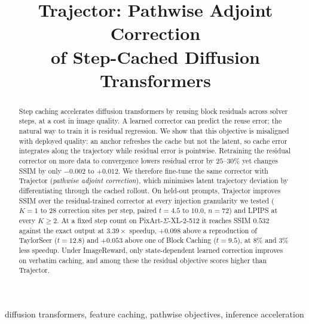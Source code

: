 \documentclass[conference,compsoc]{IEEEtran}
\newcommand{\ourmethod}{Trajector}
\begin{document}

\title{Trajector: Pathwise Adjoint Correction\\ of Step-Cached Diffusion Transformers}

\author{
}

\maketitle

\begin{abstract}
Step caching accelerates diffusion transformers by reusing block residuals
across solver steps, at a cost in image quality. A learned corrector can
predict the reuse error; the natural way to train it is residual regression. We show that this objective is misaligned with
deployed quality: an anchor refreshes the cache but not the latent, so cache
error integrates along the trajectory while residual error is pointwise.
Retraining the residual corrector on more data to convergence lowers residual error by $25$--$30\%$ yet changes SSIM by only $-0.002$ to $+0.012$. We therefore fine-tune the same corrector with
\ourmethod{} (\emph{pathwise adjoint correction}), which minimises latent trajectory
deviation by differentiating through the cached rollout. On
held-out prompts, \ourmethod{} improves SSIM over the residual-trained corrector at every injection granularity we tested ($K{=}1$ to $28$ correction sites per step, paired $t{=}4.5$ to $10.0$, $n{=}72$) and LPIPS at every $K{\ge}2$. At a fixed step count on
PixArt-$\Sigma$-XL-2-512 it reaches SSIM $0.532$ against the exact output at
$3.39\times$ speedup, $+0.098$ above a reproduction of TaylorSeer
($t{=}12.8$) and $+0.053$ above one of Block Caching ($t{=}9.5$), at
$8\%$ and $3\%$ less speedup. Under
ImageReward, only state-dependent learned correction improves on verbatim
caching, and among these the residual objective scores higher than \ourmethod{}.
\end{abstract}

\begin{IEEEkeywords}
diffusion transformers, feature caching, pathwise objectives, inference acceleration
\end{IEEEkeywords}
\end{document}

